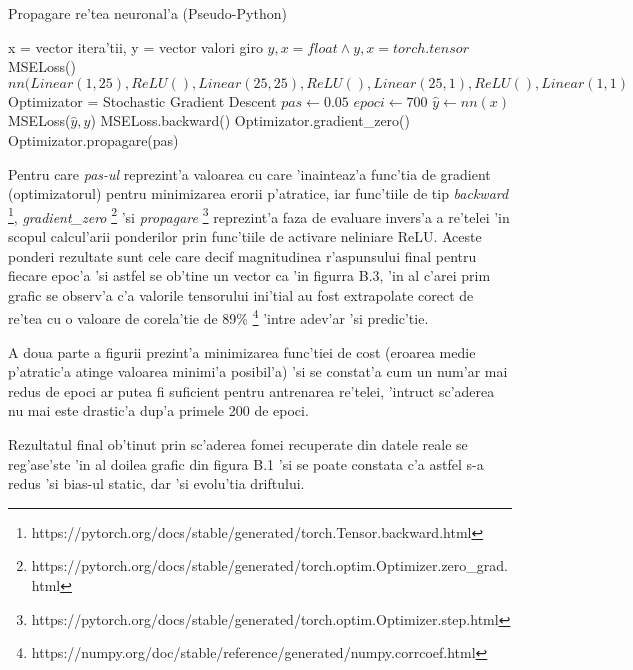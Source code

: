 \begin{algorithm}
\caption{Propagare re'tea neuronal'a (Pseudo-Python)}
\begin{algorithmic} 
\REQUIRE  x = vector itera'tii, y = vector valori giro
\ENSURE $y,x = float \wedge y,x = torch.tensor$
\ENSURE MSELoss()
\ENSURE $nn(Linear(1,25),ReLU(),Linear(25,25),ReLU(),Linear(25,1),ReLU(),Linear(1,1)$
\ENSURE Optimizator = Stochastic Gradient Descent 
\STATE $ pas \leftarrow 0.05$
\STATE $epoci \leftarrow 700$
\STATE $\hat y \leftarrow nn(x)$
\STATE MSELoss($\hat y, y$)
\STATE MSELoss.backward()
\STATE Optimizator.gradient\_zero()
\STATE Optimizator.propagare(pas)
\ENDFOR
\end{algorithmic}
\end{algorithm}

Pentru care \textit{pas-ul} reprezint'a valoarea cu care 'inainteaz'a func'tia de gradient (optimizatorul) pentru minimizarea erorii p'atratice, iar func'tiile de tip \textit{backward} \footnote{https://pytorch.org/docs/stable/generated/torch.Tensor.backward.html}, \textit{gradient\_zero} \footnote{https://pytorch.org/docs/stable/generated/torch.optim.Optimizer.zero_grad.html} 'si \textit{propagare} \footnote{https://pytorch.org/docs/stable/generated/torch.optim.Optimizer.step.html} reprezint'a faza de evaluare invers'a a re'telei 'in scopul calcul'arii ponderilor prin func'tiile de activare neliniare ReLU. Aceste ponderi rezultate sunt cele care decif magnitudinea r'aspunsului final pentru fiecare epoc'a 'si astfel se ob'tine un vector ca 'in figurra B.3, 'in al c'arei prim grafic se observ'a c'a valorile tensorului ini'tial au fost extrapolate corect de re'tea cu o valoare de corela'tie de 89\% \footnote{https://numpy.org/doc/stable/reference/generated/numpy.corrcoef.html} 'intre adev'ar 'si predic'tie.

\vspace{5px}

A doua parte a figurii prezint'a minimizarea func'tiei de cost (eroarea medie p'atratic'a atinge valoarea minimi'a posibil'a) 'si se constat'a cum un num'ar mai redus de epoci ar putea fi suficient pentru antrenarea re'telei, 'intruc\ia t sc'aderea nu mai este drastic'a dup'a primele 200 de epoci. 
\vspace{5px}

Rezultatul final ob'tinut prin sc'aderea fomei recuperate din datele reale se reg'ase'ste 'in al doilea grafic din figura B.1 'si se poate constata c'a astfel s-a redus 'si bias-ul static, dar 'si evolu'tia driftului.

